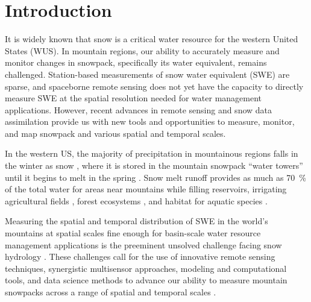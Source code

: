 
\hypertarget{ch1}{%
\chapter{Introduction}\label{ch1}}


It is widely known that snow is a critical water resource for the western United States (WUS). In mountain regions, our ability to accurately measure and monitor changes in snowpack, specifically its water equivalent, remains challenged. 
Station-based measurements of snow water equivalent (SWE) are sparse, and spaceborne remote sensing does not yet have the capacity to directly measure SWE at the spatial resolution needed for water management applications. However, recent advances in remote sensing \citep{lievensSnowDepthVariability2019,tarriconeEstimatingSnowAccumulation2023a, tsangReviewArticleGlobal2022} and snow data assimilation \citep{margulisLandsatEraSierraNevada2016} provide us with new tools and opportunities to measure, monitor, and map snowpack and various spatial and temporal scales.

In the western US, the majority of precipitation in mountainous regions falls in the winter as snow \citep{serrezeCharacteristicsWesternUnited1999}, where it is stored in the mountain snowpack “water towers” until it begins to melt in the spring \citep{immerzeelImportanceVulnerabilityWorld2020,viviroliIncreasingDependenceLowland2020}. Snow melt runoff provides as much as 70~\% of the total water for areas near mountains \citep{liHowMuchRunoff2017} while filling reservoirs, irrigating agricultural fields \citep{qinSnowmeltRiskTelecouplings2022a}, forest ecosystems \citep{varholaForestCanopyEffects2010}, and habitat for aquatic species \citep{yarnellEcologyManagementSpring2010}. 

Measuring the spatial and temporal distribution of SWE in the world’s mountains at spatial scales fine enough for basin-scale water resource management applications is the preeminent unsolved challenge facing snow hydrology \citep{lettenmaierInroadsRemoteSensing2015, dozierEstimatingSpatialDistribution2016}. These challenges call for the use of innovative remote sensing techniques, synergistic multisensor approaches, modeling and computational tools, and data science methods to advance our ability to measure mountain snowpacks across a range of spatial and temporal scales \citep{dozierMountainHydrologySnow2011}. 

